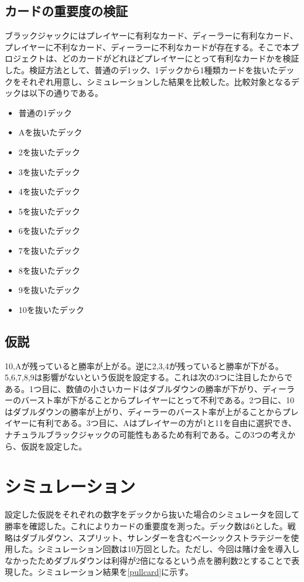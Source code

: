 \subsection{カードの重要度の検証}
ブラックジャックにはプレイヤーに有利なカード、ディーラーに有利なカード、プレイヤーに不利なカード、ディーラーに不利なカードが存在する。そこで本プロジェクトは、どのカードがどれほどプレイヤーにとって有利なカードかを検証した。検証方法として、普通のデ1ック、1デックから1種類カードを抜いたデックをそれぞれ用意し、シミュレーションした結果を比較した。比較対象となるデックは以下の通りである。

\begin{itemize}
 \item 普通の1デック
 \item Aを抜いたデック
 \item 2を抜いたデック
 \item 3を抜いたデック
 \item 4を抜いたデック
 \item 5を抜いたデック
 \item 6を抜いたデック
 \item 7を抜いたデック
 \item 8を抜いたデック
 \item 9を抜いたデック
 \item 10を抜いたデック
\end{itemize}

\subsection{仮説}
10,Aが残っていると勝率が上がる。逆に2,3,4が残っていると勝率が下がる。5,6,7,8,9は影響がないという仮説を設定する。これは次の3つに注目したからである。1つ目に、数値の小さいカードはダブルダウンの勝率が下がり、ディーラーのバースト率が下がることからプレイヤーにとって不利である。2つ目に、10はダブルダウンの勝率が上がり、ディーラーのバースト率が上がることからプレイヤーに有利である。3つ目に、Aはプレイヤーの方が1と11を自由に選択でき、ナチュラルブラックジャックの可能性もあるため有利である。この3つの考えから、仮説を設定した。

\section{シミュレーション}
設定した仮説をそれぞれの数字をデックから抜いた場合のシミュレータを回して勝率を確認した。これによりカードの重要度を測った。デック数は6とした。戦略はダブルダウン、スプリット、サレンダーを含むベーシックストラテジーを使用した。シミュレーション回数は10万回とした。ただし、今回は賭け金を導入しなかったためダブルダウンは利得が2倍になるという点を勝利数2とすることで表現した。シミュレーション結果を\ref{pullcard}に示す。

